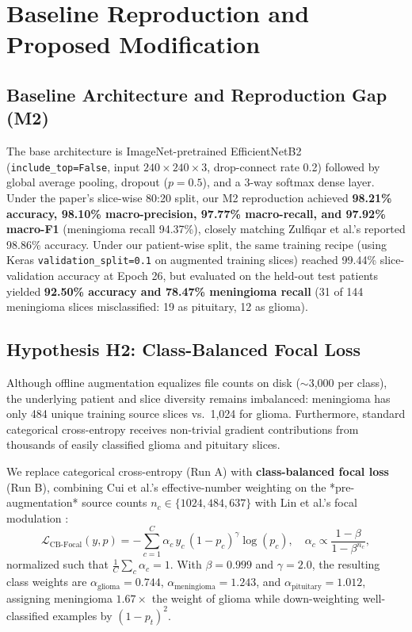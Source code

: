 \documentclass[conference]{IEEEtran}
\begin{document}
\section{Baseline Reproduction and Proposed Modification}

\subsection{Baseline Architecture and Reproduction Gap (M2)}
The base architecture is ImageNet-pretrained EfficientNetB2 (\texttt{include\_top=False}, input $240\times240\times3$, drop-connect rate 0.2) followed by global average pooling, dropout ($p=0.5$), and a 3-way softmax dense layer. Under the paper's slice-wise 80:20 split, our M2 reproduction achieved \textbf{98.21\% accuracy, 98.10\% macro-precision, 97.77\% macro-recall, and 97.92\% macro-F1} (meningioma recall 94.37\%), closely matching Zulfiqar et al.'s reported 98.86\% accuracy. Under our patient-wise split, the same training recipe (using Keras \texttt{validation\_split=0.1} on augmented training slices) reached 99.44\% slice-validation accuracy at Epoch 26, but evaluated on the held-out test patients yielded \textbf{92.50\% accuracy and 78.47\% meningioma recall} (31 of 144 meningioma slices misclassified: 19 as pituitary, 12 as glioma).

\subsection{Hypothesis H2: Class-Balanced Focal Loss}
Although offline augmentation equalizes file counts on disk ($\sim$3,000 per class), the underlying patient and slice diversity remains imbalanced: meningioma has only 484 unique training source slices vs.\ 1,024 for glioma. Furthermore, standard categorical cross-entropy receives non-trivial gradient contributions from thousands of easily classified glioma and pituitary slices.

We replace categorical cross-entropy (Run A) with \textbf{class-balanced focal loss} (Run B), combining Cui et al.'s effective-number weighting \cite{cui2019class} on the *pre-augmentation* source counts $n_c \in \{1024, 484, 637\}$ with Lin et al.'s focal modulation \cite{lin2017focal}:
\begin{equation}
\mathcal{L}_{\text{CB-Focal}}(y, p) = -\sum_{c=1}^{C} \alpha_c \, y_c \, (1 - p_c)^\gamma \log(p_c),
\quad
\alpha_c \propto \frac{1 - \beta}{1 - \beta^{n_c}},
\end{equation}
normalized such that $\frac{1}{C}\sum_{c} \alpha_c = 1$. With $\beta = 0.999$ and $\gamma = 2.0$, the resulting class weights are $\alpha_{\text{glioma}} = 0.744$, $\alpha_{\text{meningioma}} = 1.243$, and $\alpha_{\text{pituitary}} = 1.012$, assigning meningioma $1.67\times$ the weight of glioma while down-weighting well-classified examples by $(1-p_t)^2$.
\end{document}

